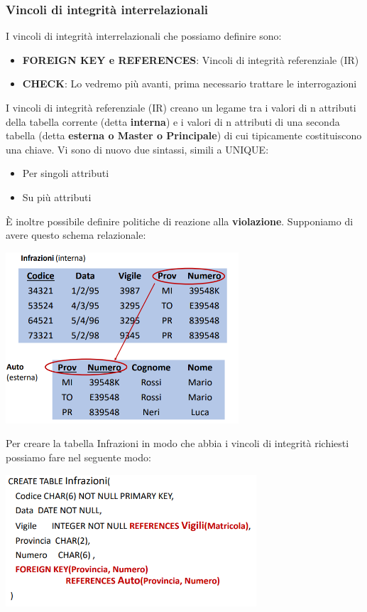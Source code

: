 \documentclass[12pt]{article}
\begin{document}
\subsubsection{Vincoli di integrità interrelazionali}
I vincoli di integrità interrelazionali che possiamo definire sono:
\begin{itemize}
    \item \textbf{FOREIGN KEY e REFERENCES}: Vincoli di integrità referenziale (IR)
    \item \textbf{CHECK}: Lo vedremo più avanti, prima necessario trattare le interrogazioni
\end{itemize}
I vincoli di integrità referenziale (IR) creano un legame tra i valori di n attributi della tabella corrente (detta \textbf{interna}) e i valori di n attributi di una seconda tabella (detta \textbf{esterna o Master o Principale}) di cui tipicamente costituiscono una chiave.
Vi sono di nuovo due sintassi, simili a UNIQUE:
\begin{itemize}
    \item Per singoli attributi
    \item Su più attributi
\end{itemize}
È inoltre possibile definire politiche di reazione alla \textbf{violazione}.
\newpage
\noindent
Supponiamo di avere questo schema relazionale:
\begin{center}
    \includegraphics[width = 0.65\textwidth]{Images/182.PNG}
\end{center}
Per creare la tabella Infrazioni in modo che abbia i vincoli di integrità richiesti possiamo fare nel seguente modo:
\begin{center}
    \includegraphics[width = 0.70\textwidth]{Images/183.PNG}
\end{center}
\end{document}
